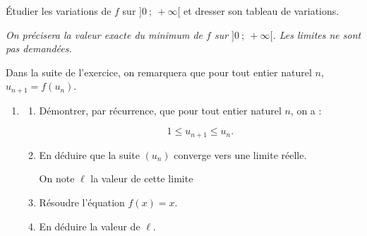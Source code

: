 \documentclass[10pt]{article}
\begin{document}
\begin{enumerate}
Étudier les variations de $f$ sur $]0~;~+\infty[$ et dresser son tableau de variations.
	
\emph{On précisera la valeur exacte du minimum de $f$ sur $]0~;~+\infty[$. Les limites ne sont pas demandées.}
\end{enumerate}

Dans la suite de l'exercice, on remarquera que pour tout entier naturel $n$,\: $u_{n+1} = f\left(u_n\right)$.

\begin{enumerate}[resume]
\item 
	\begin{enumerate}
		\item Démontrer, par récurrence, que pour tout entier naturel $n$, on a : 

		\[ 1 \leqslant u_{n+1} \leqslant u_n. \]
		\item En déduire que la suite $\left(u_n\right)$ converge vers une limite réelle.

On note $\ell$ la valeur de cette limite 
		\item Résoudre l'équation $f(x) = x$.
		\item En déduire la valeur de $\ell$.
	\end{enumerate}
\end{enumerate}

\bigskip
\end{document}
